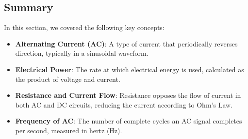 
\subsection*{Summary}
In this section, we covered the following key concepts:
\begin{itemize}
    \item \textbf{Alternating Current (AC)}: A type of current that periodically reverses direction, typically in a sinusoidal waveform.
    \item \textbf{Electrical Power}: The rate at which electrical energy is used, calculated as the product of voltage and current.
    \item \textbf{Resistance and Current Flow}: Resistance opposes the flow of current in both AC and DC circuits, reducing the current according to Ohm's Law.
    \item \textbf{Frequency of AC}: The number of complete cycles an AC signal completes per second, measured in hertz (Hz).
\end{itemize}
